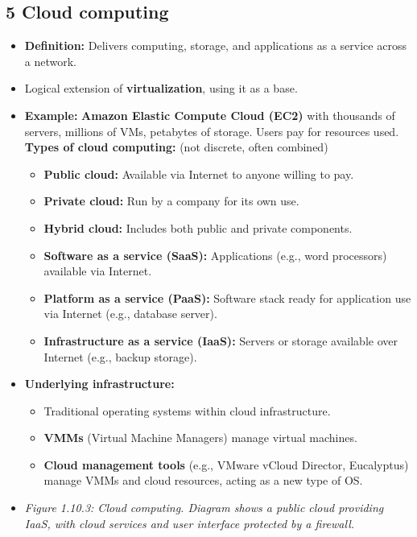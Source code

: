 \documentclass{article}
\begin{document}
\subsection*{5 Cloud computing}
\begin{itemize}
    \item \textbf{Definition:} Delivers computing, storage, and applications as a service across a network.
    \item Logical extension of \textbf{virtualization}, using it as a base.
    \item \textbf{Example:} \textbf{Amazon Elastic Compute Cloud (EC2)} with thousands of servers, millions of VMs, petabytes of storage. Users pay for resources used.
    \textbf{Types of cloud computing:} (not discrete, often combined)
    \begin{itemize}
        \item \textbf{Public cloud:} Available via Internet to anyone willing to pay.
        \item \textbf{Private cloud:} Run by a company for its own use.
        \item \textbf{Hybrid cloud:} Includes both public and private components.
        \item \textbf{Software as a service (SaaS):} Applications (e.g., word processors) available via Internet.
        \item \textbf{Platform as a service (PaaS):} Software stack ready for application use via Internet (e.g., database server).
        \item \textbf{Infrastructure as a service (IaaS):} Servers or storage available over Internet (e.g., backup storage).
    \end{itemize}
    \item \textbf{Underlying infrastructure:}
    \begin{itemize}
        \item Traditional operating systems within cloud infrastructure.
        \item \textbf{VMMs} (Virtual Machine Managers) manage virtual machines.
        \item \textbf{Cloud management tools} (e.g., VMware vCloud Director, Eucalyptus) manage VMMs and cloud resources, acting as a new type of OS.
    \end{itemize}
    \item \textit{Figure 1.10.3: Cloud computing. Diagram shows a public cloud providing IaaS, with cloud services and user interface protected by a firewall.}
\end{itemize}
\end{document}
